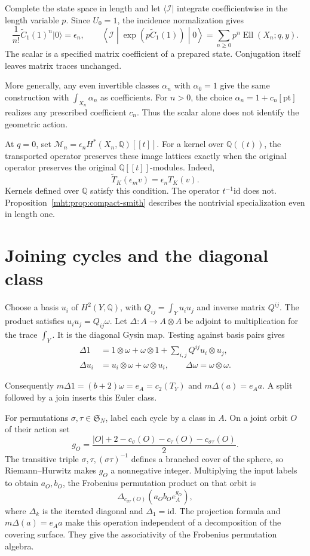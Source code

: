 Complete the state space in length and let
\(\langle\mathcal I|\) integrate coefficientwise in the length variable \(p\).
Since \(U_0=1\), the incidence normalization gives
\[
 \frac1{n!}\widetilde C_1(1)^n|0\rangle=\epsilon_n,\qquad
 \left\langle\mathcal I\middle|
     \exp(p\widetilde C_1(1))\middle|0\right\rangle
        =\sum_{n\geq0}p^n\operatorname{Ell}(X_n;q,y).
\]
The scalar is a specified matrix coefficient of a prepared
state. Conjugation itself leaves matrix traces unchanged.

More generally, any even invertible classes \(\alpha_n\)
with \(\alpha_0=1\) give the same construction with
\(\int_{X_n}\alpha_n\) as coefficients.
For \(n>0\), the choice
\(\alpha_n=1+c_n[\mathrm{pt}]\) realizes any prescribed
coefficient \(c_n\). Thus the scalar alone does not identify
the geometric action.

At \(q=0\), set
\(\mathcal M_n=\epsilon_nH^*(X_n,\mathbb Q)[[t]]\).
For a kernel over \(\mathbb Q((t))\), the transported
operator preserves these image lattices exactly when
the original operator preserves the original
\(\mathbb Q[[t]]\)-modules. Indeed,
\[
 \widetilde T_K(\epsilon_m v)=\epsilon_nT_K(v).
\]
Kernels defined over \(\mathbb Q\) satisfy this condition.
The operator \(t^{-1}\mathrm{id}\) does not.
Proposition~\ref{mht:prop:compact-smith} describes the
nontrivial specialization even in length one.

\section{Joining cycles and the diagonal class}

Choose a basis \(u_i\) of \(H^2(Y,\mathbb Q)\), with
\(Q_{ij}=\int_Yu_iu_j\) and inverse matrix \(Q^{ij}\).
The product satisfies \(u_iu_j=Q_{ij}\omega\).
Let \(\Delta:A\to A\otimes A\) be adjoint to multiplication
for the trace \(\int_Y\). It is the diagonal Gysin map.
Testing against basis pairs gives
\[
\begin{aligned}
 \Delta1&=1\otimes\omega+\omega\otimes1+
                         \sum_{i,j}Q^{ij}u_i\otimes u_j,\\
 \Delta u_i&=u_i\otimes\omega+\omega\otimes u_i,\qquad
 \Delta\omega=\omega\otimes\omega.
\end{aligned}
\]

Consequently \(m\Delta1=(b+2)\omega=e_A=c_2(T_Y)\)
and \(m\Delta(a)=e_Aa\).
A split followed by a join inserts this Euler class.

For permutations \(\sigma,\tau\in\mathfrak S_N\), label
each cycle by a class in \(A\).
On a joint orbit \(O\) of their action set
\[
 g_O=\frac{|O|+2-c_\sigma(O)-c_\tau(O)
                              -c_{\sigma\tau}(O)}2.
\]
The transitive triple
\(\sigma,\tau,(\sigma\tau)^{-1}\) defines a branched cover
of the sphere, so Riemann--Hurwitz makes \(g_O\) a
nonnegative integer.
Multiplying the input labels to obtain \(a_O,b_O\), the
Frobenius permutation product on that orbit is
\[
 \Delta_{c_{\sigma\tau}(O)}(a_Ob_Oe_A^{g_O}),
\]
where \(\Delta_k\) is the iterated diagonal and
\(\Delta_1=\mathrm{id}\).
The projection formula and \(m\Delta(a)=e_Aa\) make this
operation independent of a decomposition of the covering
surface. They give the associativity of the Frobenius
permutation algebra.

